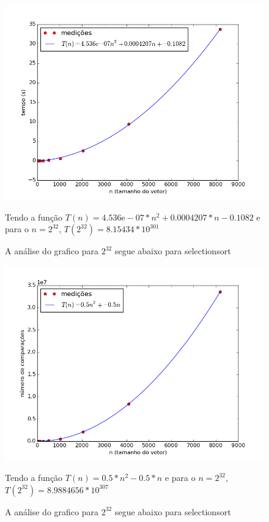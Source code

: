 \documentclass[12pt,a4paper,twoside]{report}
\begin{document}


\begin{figure}[ht]
\centering \includegraphics[scale=0.8]{../selectionsort/imagens/selectionsortQuaseDecresc200.png}
\caption{A análise do grafico para $2^{32}$ segue abaixo para selectionsort}

Tendo a função $T(n) = 4.536\mathrm{e}-07*n^{2}+0.0004207*n-0.1082$ e para o $n =2^{32}$, $T(2^{32}) = 8.15434*10^{301}$
\label{fig:selectionsortQuaseDecresc200}
\end{figure}

\begin{figure}[ht]
\centering \includegraphics[scale=0.8]{../selectionsort/imagens/selectionsortQuaseDecresc201.png}
\caption{A análise do grafico para $2^{32}$ segue abaixo para selectionsort}

Tendo a função $T(n) = 0.5*n^{2}-0.5*n$ e para o $n =2^{32}$, $T(2^{32}) =8.9884656 * 10^{307}$
\label{fig:selectionsortQuaseDecresc201}
\end{figure}
\end{document}

